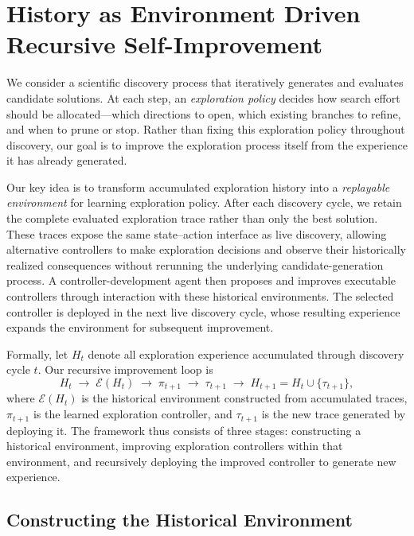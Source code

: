 \section{History as Environment Driven Recursive Self-Improvement}
\label{sec:method}

We consider a scientific discovery process that iteratively generates and
evaluates candidate solutions. At each step, an \emph{exploration policy}
decides how search effort should be allocated---which directions to open, which
existing branches to refine, and when to prune or stop. Rather than fixing this
exploration policy throughout discovery, our goal is to improve the exploration process
itself from the experience it has already generated.

Our key idea is to transform accumulated exploration history into a
\emph{replayable environment} for learning exploration policy. After each
discovery cycle, we retain the complete evaluated exploration trace rather than
only the best solution. These traces expose the same state--action interface as
live discovery, allowing alternative controllers to make exploration decisions
and observe their historically realized consequences without rerunning the
underlying candidate-generation process. A controller-development agent then
proposes and improves executable controllers through interaction with these
historical environments. The selected controller is deployed in the next live
discovery cycle, whose resulting experience expands the environment for
subsequent improvement.

Formally, let $H_t$ denote all exploration experience accumulated through
discovery cycle $t$. Our recursive improvement loop is
\begin{equation}
    H_t
    \;\longrightarrow\;
    \mathcal{E}(H_t)
    \;\longrightarrow\;
    \pi_{t+1}
    \;\longrightarrow\;
    \tau_{t+1}
    \;\longrightarrow\;
    H_{t+1}=H_t\cup\{\tau_{t+1}\},
    \label{eq:outer-loop}
\end{equation}
where $\mathcal{E}(H_t)$ is the historical environment constructed from
accumulated traces, $\pi_{t+1}$ is the learned exploration controller, and
$\tau_{t+1}$ is the new trace generated by deploying it. The framework thus
consists of three stages: constructing a historical environment, improving
exploration controllers within that environment, and recursively deploying the
improved controller to generate new experience.


\subsection{Constructing the Historical Environment}
\label{sec:historical-environment}

